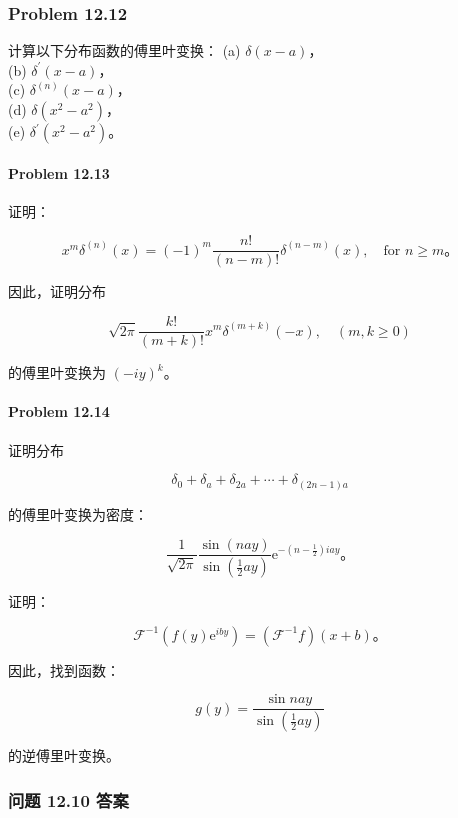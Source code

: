 \subsubsection{Problem 12.12}\label{problem-12.12}

计算以下分布函数的傅里叶变换： (a) \(\delta(x - a)\)，\\
(b) \(\delta^{\prime}(x - a)\)，\\
(c) \(\delta^{(n)}(x - a)\)，\\
(d) \(\delta\left( x^{2} - a^{2} \right)\)，\\
(e) \(\delta^{\prime}\left( x^{2} - a^{2} \right)\)。

\paragraph{Problem 12.13}\label{problem-12.13}

证明：

\[x^{m}\delta^{(n)}(x) = ( - 1)^{m}\frac{n!}{(n - m)!}\delta^{(n - m)}(x),\quad\mathrm{\text{for }}n \geq m。\]

因此，证明分布

\[\sqrt{2\pi}\frac{k!}{(m + k)!}x^{m}\delta^{(m + k)}( - x),\quad(m,k \geq 0)\]

的傅里叶变换为 \(( - iy)^{k}\)。

\paragraph{Problem 12.14}\label{problem-12.14}

证明分布

\[\delta_{0} + \delta_{a} + \delta_{2a} + \cdots + \delta_{(2n - 1)a}\]

的傅里叶变换为密度：

\[\frac{1}{\sqrt{2\pi}}\frac{\sin(nay)}{\sin\left( \frac{1}{2}ay \right)}\mathrm{e}^{- \left( n - \frac{1}{2} \right)iay}。\]

证明：

\[\mathcal{F}^{- 1}\left( f(y)\mathrm{e}^{iby} \right) = \left( \mathcal{F}^{- 1}f \right)(x + b)。\]

因此，找到函数：

\[g(y) = \frac{\sin nay}{\sin\left( \frac{1}{2}ay \right)}\]

的逆傅里叶变换。

\subsubsection{问题 12.10 答案}\label{ux95eeux9898-12.10-ux7b54ux6848}

